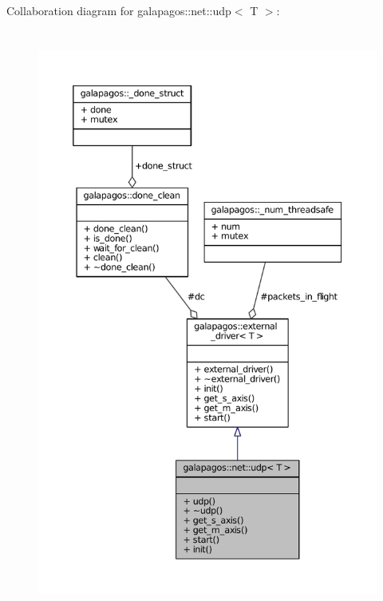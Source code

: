 Collaboration diagram for galapagos\+:\+:net\+:\+:udp$<$ T $>$\+:
\nopagebreak
\begin{figure}[H]
\begin{center}
\leavevmode
\includegraphics[height=550pt]{classgalapagos_1_1net_1_1udp__coll__graph}
\end{center}
\end{figure}
